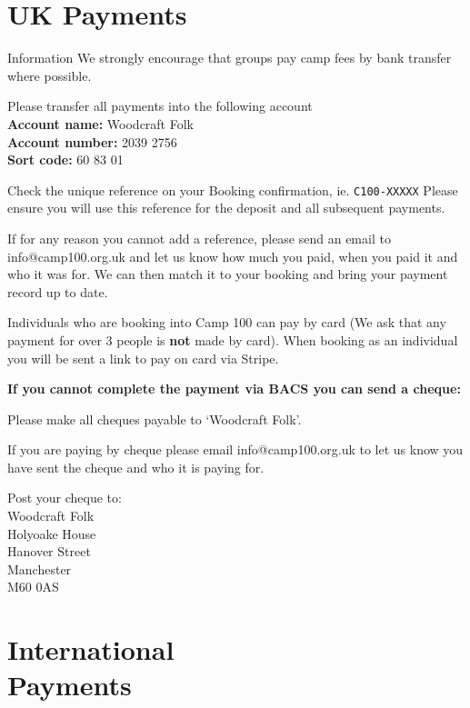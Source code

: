 \documentclass[a4paper, 11pt]{report}
\begin{document}
\makedocumenttitlepage

\tableofcontents

\chapter{UK Payments}

\begin{callout-green}{Information}
We strongly encourage that groups pay camp fees by bank transfer where possible.
\end{callout-green}

Please transfer all payments into the following account\\
\textbf{Account name:} Woodcraft Folk\\
\textbf{Account number:} 2039 2756\\
\textbf{Sort code:} 60 83 01

Check the unique reference on your Booking confirmation, ie. \verb|C100-XXXXX| Please ensure you will use this reference for the deposit and all subsequent payments.

If for any reason you cannot add a reference, please send an email to info@camp100.org.uk and let us know how much you paid, when you paid it and who it was for. We can then match it to your booking and bring your payment record up to date.

Individuals who are booking into Camp 100 can pay by card (We ask that any payment for over 3 people is \textbf{not} made by card). When booking as an individual you will be sent a link to pay on card via Stripe.

\textbf{If you cannot complete the payment via BACS you can send a cheque:}

Please make all cheques payable to `Woodcraft Folk'.

If you are paying by cheque please email info@camp100.org.uk to let us know you have sent the cheque and who it is paying for. 

Post your cheque to:\\
Woodcraft Folk\\
Holyoake House\\
Hanover Street\\
Manchester \\
M60 0AS\\

\chapter[International Payments]{International\\ Payments}
\end{document}
